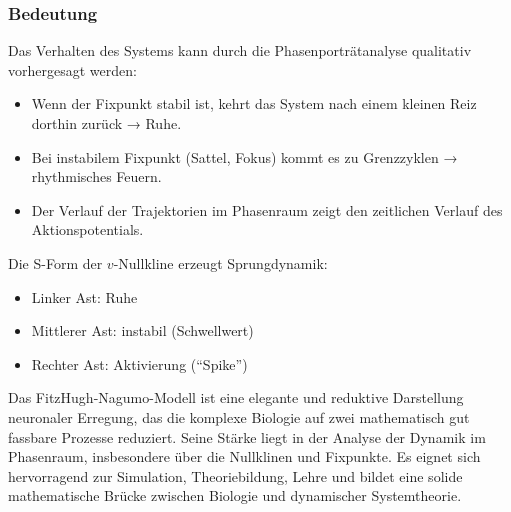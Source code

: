 \subsubsection{Bedeutung}
Das Verhalten des Systems kann durch die Phasenporträtanalyse qualitativ vorhergesagt werden:
\begin{itemize}
	\item Wenn der Fixpunkt stabil ist, kehrt das System nach einem kleinen Reiz dorthin zurück → Ruhe.
	\item Bei instabilem Fixpunkt (Sattel, Fokus) kommt es zu Grenzzyklen → rhythmisches Feuern.
	\item Der Verlauf der Trajektorien im Phasenraum zeigt den zeitlichen Verlauf des Aktionspotentials.
\end{itemize}
Die S-Form der $v$-Nullkline erzeugt Sprungdynamik:
\begin{itemize}
	\item Linker Ast: Ruhe
	\item Mittlerer Ast: instabil (Schwellwert)
	\item Rechter Ast: Aktivierung (``Spike'')
\end{itemize}
Das FitzHugh-Nagumo-Modell ist eine elegante und reduktive Darstellung neuronaler Erregung, das die komplexe Biologie auf zwei mathematisch gut fassbare Prozesse reduziert. Seine Stärke liegt in der Analyse der Dynamik im Phasenraum, insbesondere über die Nullklinen und Fixpunkte. Es eignet sich hervorragend zur Simulation, Theoriebildung, Lehre und bildet eine solide mathematische Brücke zwischen Biologie und dynamischer Systemtheorie.

